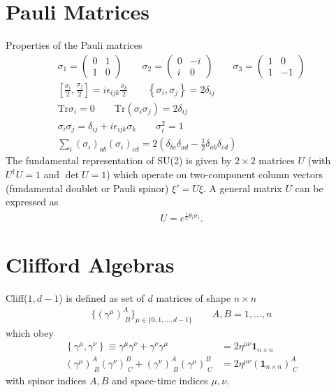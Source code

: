 \documentclass[10pt,a4paper]{book}
\theoremstyle{definition}
\begin{document}
\section{Pauli Matrices}
Properties of the Pauli matrices
\begin{align}
\sigma_1=\left(
\begin{matrix}
0    & 1\\
1 &  0
\end{matrix}
\right)\qquad
\sigma_2=\left(
\begin{matrix}
0    & -i\\
i &  0
\end{matrix}
\right)\qquad
\sigma_3=
\left(
\begin{matrix}
1 & 0\\
1 &  -1
\end{matrix}
\right)\\
%
\left[\frac{\sigma_i}{2},\frac{\sigma_j}{2}\right]=i\epsilon_{ijk}\frac{\sigma_k}{2}\qquad\left\{\sigma_i,\sigma_j\right\}=2\delta_{ij}\\
\mathrm{Tr}\sigma_i=0\qquad\mathrm{Tr}(\sigma_i\sigma_j)=2\delta_{ij}\\
\sigma_i\sigma_j=\delta_{ij}+i\epsilon_{ijk}\sigma_k\qquad\sigma_i^2=1\\
\sum_i(\sigma_i)_{ab}(\sigma_i)_{cd}=2(\delta_{bc}\delta_{ad}-\frac{1}{2}\delta_{ab}\delta_{cd})
\end{align}
The fundamental representation of SU(2) is given by $2\times2$ matrices $U$ (with $U^\dagger U=1$ and $\det U=1$) which operate on two-component column vectors (fundamental doublet or Pauli spinor) $\xi'=U\xi$. A general matrix $U$ can be expressed as
\begin{align}
U=e^{\frac{i}{2}\theta_i\sigma_i}.
\end{align}

\section{Clifford Algebras}
Cliff($1,d-1$) is defined as set of $d$ matrices of shape $n\times n$
\begin{align}
\{(\gamma^\mu)^A_{\;B}\}_{\mu\in\{0,1,...,d-1\}}\qquad A,B=1,...,n
\end{align}
which obey
\begin{align}
\left\{\gamma^\mu,\gamma^\nu\right\}\equiv\gamma^\mu\gamma^\nu+\gamma^\nu\gamma^\mu&=2\eta^{\mu\nu}\mathbf{1}_{n\times n}\\
(\gamma^\mu)^A_{\;B}(\gamma^\nu)^B_{\;C}+(\gamma^\nu)^A_{\;B}(\gamma^\mu)^B_{\;C}&=2\eta^{\mu\nu}(\mathbf{1}_{n\times n})^A_{\;C}
\end{align}
with spinor indices $A, B$ and space-time indices $\mu, \nu$.
\end{document}
